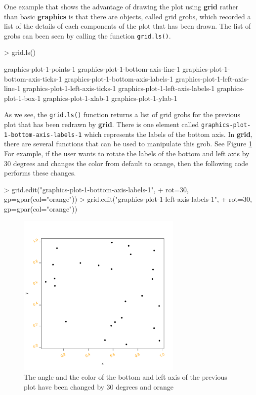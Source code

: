\documentclass{report}
\begin{document}
One example that shows the advantage of drawing the plot using \textbf{grid} rather than basic \textbf{graphics} is that there are objects, called grid grobs, which recorded a list of the details of each components of the plot that has been drawn. The list of grobs can been seen by calling the function \texttt{grid.ls()}. \\
\begin{Schunk}
\begin{Sinput}
> grid.ls()
\end{Sinput}
\begin{Soutput}
graphics-plot-1-points-1
graphics-plot-1-bottom-axis-line-1
graphics-plot-1-bottom-axis-ticks-1
graphics-plot-1-bottom-axis-labels-1
graphics-plot-1-left-axis-line-1
graphics-plot-1-left-axis-ticks-1
graphics-plot-1-left-axis-labels-1
graphics-plot-1-box-1
graphics-plot-1-xlab-1
graphics-plot-1-ylab-1
\end{Soutput}
\end{Schunk}


As we see, the \texttt{grid.ls()} function returns a list of grid grobs for the previous plot that has been redrawn by \textbf{grid}. There is one element called \texttt{graphics-plot-1-bottom-axis-labels-1} which represents the labels of the bottom axis. In \textbf{grid}, there are several functions that can be used to manipulate this grob. See Figure \ref{figure_1.2} \\

For example, if the user wants to rotate the labels of the bottom and left axis by 30 degrees and changes the color from default to orange, then the following code performs these changes.
\begin{Schunk}
\begin{Sinput}
> grid.edit("graphics-plot-1-bottom-axis-labels-1", 
+           rot=30, gp=gpar(col="orange"))
> grid.edit("graphics-plot-1-left-axis-labels-1", 
+           rot=30, gp=gpar(col="orange"))
\end{Sinput}
\end{Schunk}

\begin{figure}[h]
	\begin{center}
		\includegraphics[height = 8cm, width = 8cm]{figure/report_basic_demo_4.pdf}
		\caption{The angle and the color of the bottom and left axis of the previous plot have been changed by 30 degrees and orange}
		\label{figure_1.2}
	\end{center}
\end{figure}
\end{document}
